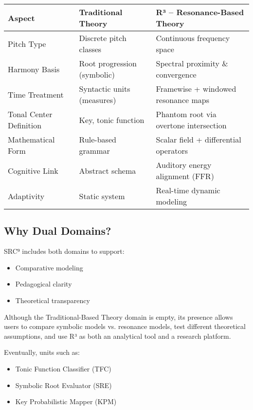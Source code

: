 \documentclass{article}
\begin{document}
\begin{center}
\begin{tabular}{|l|p{4.5cm}|p{5.5cm}|}
\hline
\textbf{Aspect} & \textbf{Traditional Theory} & \textbf{R³ – Resonance-Based Theory} \\
\hline
Pitch Type & Discrete pitch classes & Continuous frequency space \\
Harmony Basis & Root progression (symbolic) & Spectral proximity \& convergence \\
Time Treatment & Syntactic units (measures) & Framewise + windowed resonance maps \\
Tonal Center Definition & Key, tonic function & Phantom root via overtone intersection \\
Mathematical Form & Rule-based grammar & Scalar field + differential operators \\
Cognitive Link & Abstract schema & Auditory energy alignment (FFR) \\
Adaptivity & Static system & Real-time dynamic modeling \\
\hline
\end{tabular}
\end{center}

\subsection*{Why Dual Domains?}

SRC⁹ includes both domains to support:

\begin{itemize}
    \item Comparative modeling
    \item Pedagogical clarity
    \item Theoretical transparency
\end{itemize}

Although the Traditional-Based Theory domain is empty, its presence allows users to compare symbolic models vs. resonance models, test different theoretical assumptions, and use R³ as both an analytical tool and a research platform.

Eventually, units such as:

\begin{itemize}
    \item Tonic Function Classifier (TFC)
    \item Symbolic Root Evaluator (SRE)
    \item Key Probabilistic Mapper (KPM)
\end{itemize}
\end{document}
